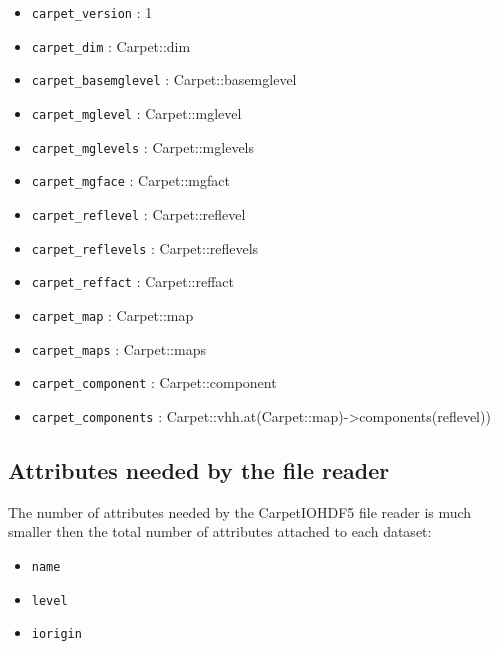 \begin{itemize}
\begin{itemize}
    \item {\tt carpet\_version} : 1
    \item {\tt carpet\_dim} : Carpet::dim
    \item {\tt carpet\_basemglevel} : Carpet::basemglevel
    \item {\tt carpet\_mglevel} : Carpet::mglevel
    \item {\tt carpet\_mglevels} : Carpet::mglevels
    \item {\tt carpet\_mgface} : Carpet::mgfact
    \item {\tt carpet\_reflevel} : Carpet::reflevel
    \item {\tt carpet\_reflevels} : Carpet::reflevels
    \item {\tt carpet\_reffact} : Carpet::reffact
    \item {\tt carpet\_map} : Carpet::map
    \item {\tt carpet\_maps} : Carpet::maps
    \item {\tt carpet\_component} : Carpet::component
    \item {\tt carpet\_components} : Carpet::vhh.at(Carpet::map)->components(reflevel))

    \end{itemize}
\end{itemize}

\subsection{Attributes needed by the file reader}

The number of attributes needed by the CarpetIOHDF5 file reader is much smaller then the total
number of attributes attached to each dataset:

\begin{itemize}
  \item {\tt name}
  \item {\tt level}
  \item {\tt iorigin}
\end{itemize}



